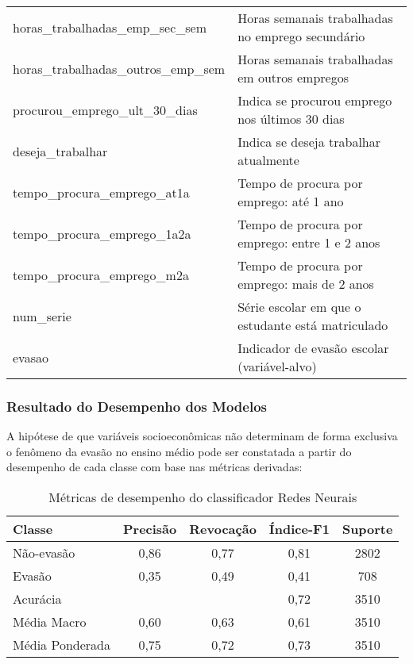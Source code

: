 \documentclass[english, spanish, brazilian]{RBIEarticle} %
\begin{document}
\begin{table}
\begin{tabular}{lp{8cm}}
horas\_trabalhadas\_emp\_sec\_sem & Horas semanais trabalhadas no emprego secundário \\
horas\_trabalhadas\_outros\_emp\_sem & Horas semanais trabalhadas em outros empregos \\
procurou\_emprego\_ult\_30\_dias & Indica se procurou emprego nos últimos 30 dias \\
deseja\_trabalhar & Indica se deseja trabalhar atualmente \\
tempo\_procura\_emprego\_at1a & Tempo de procura por emprego: até 1 ano \\
tempo\_procura\_emprego\_1a2a & Tempo de procura por emprego: entre 1 e 2 anos \\
tempo\_procura\_emprego\_m2a & Tempo de procura por emprego: mais de 2 anos \\
num\_serie & Série escolar em que o estudante está matriculado \\
evasao & Indicador de evasão escolar (variável-alvo) \\ \hline
\end{tabular}
\end{table}


\subsubsection{Resultado do Desempenho dos Modelos}
A hipótese de que variáveis socioeconômicas não determinam de forma exclusiva o fenômeno da evasão no ensino médio pode ser constatada a partir do desempenho de cada classe com base nas métricas derivadas:

\vspace{0.5cm}
\begin{table}[htbp]
\centering
\label{tab:metricas}
\begin{tabular}{lcccc}
\hline
Classe        & Precisão & Revocação & Índice-F1 & Suporte \\ \hline
Não-evasão           & 0,86     & 0,77      & 0,81     & 2802    \\
Evasão           & 0,35     & 0,49      & 0,41     & 708     \\ \hline
Acurácia      &          &           & 0,72     & 3510    \\
Média Macro   & 0,60     & 0,63      & 0,61     & 3510    \\
Média Ponderada & 0,75   & 0,72      & 0,73     & 3510    \\ \hline
\end{tabular}
\caption{Métricas de desempenho do classificador Redes Neurais}
\end{table}
\vspace{0.5cm}
\end{document}
